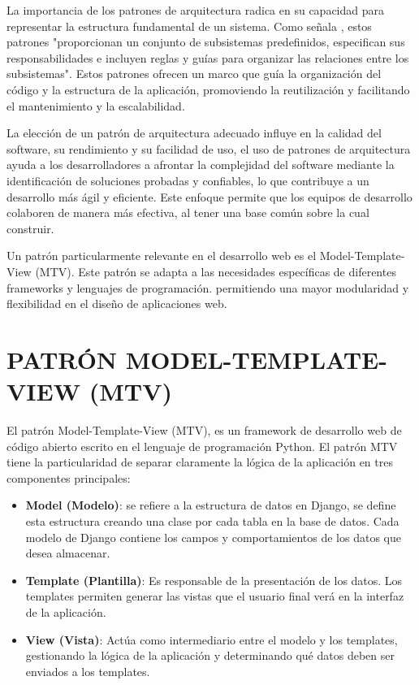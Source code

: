 		La importancia de los patrones de arquitectura radica en su capacidad para representar la estructura fundamental de un sistema. Como señala \textcite{pressman2010ingenieria}, estos patrones "proporcionan un conjunto de subsistemas predefinidos, especifican sus responsabilidades e incluyen reglas y guías para organizar las relaciones entre los subsistemas". Estos patrones ofrecen un marco que guía la organización del código y la estructura de la aplicación, promoviendo la reutilización y facilitando el mantenimiento y la escalabilidad.
		
		La elección de un patrón de arquitectura adecuado influye en la calidad del software, su rendimiento y su facilidad de uso, el uso de patrones de arquitectura ayuda a los desarrolladores a afrontar la complejidad del software mediante la identificación de soluciones probadas y confiables, lo que contribuye a un desarrollo más ágil y eficiente. Este enfoque permite que los equipos de desarrollo colaboren de manera más efectiva, al tener una base común sobre la cual construir.
		
		Un patrón particularmente relevante en el desarrollo web es el Model-Template-View (MTV). Este patrón se adapta a las necesidades específicas de diferentes frameworks y lenguajes de programación. permitiendo una mayor modularidad y flexibilidad en el diseño de aplicaciones web. 
		
	\section{PATRÓN MODEL-TEMPLATE-VIEW (MTV)}
		
		El patrón Model-Template-View (MTV), es un framework de desarrollo web de código abierto escrito en el lenguaje de programación Python. El patrón MTV tiene la particularidad de separar claramente la lógica de la aplicación en tres componentes principales:
		
		\begin{itemize}[label=$\bullet$, left=0cm, labelsep = 1.05cm, topsep = 0pt, parsep = 0pt]
			\item \textbf{Model (Modelo)}: se refiere a la estructura de datos en Django, se define esta estructura creando una clase por cada tabla en la base de datos. Cada modelo de Django contiene los campos y comportamientos de los datos que desea almacenar.
			\item \textbf{Template (Plantilla)}: Es responsable de la presentación de los datos. Los templates permiten generar las vistas que el usuario final verá en la interfaz de la aplicación.
			\item \textbf{View (Vista)}: Actúa como intermediario entre el modelo y los templates, gestionando la lógica de la aplicación y determinando qué datos deben ser enviados a los templates.
		\end{itemize}
		
